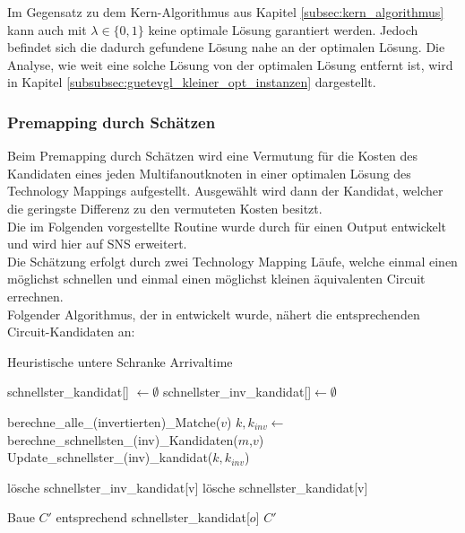 \documentclass[11pt, a4paper, german]{article}
\newcommand{\TM}{Technology  Mapping }
\begin{document}
Im Gegensatz zu dem Kern-Algorithmus aus Kapitel \ref{subsec:kern_algorithmus} kann auch mit $\lambda \in \{ 0 , 1\}$ keine optimale Lösung garantiert werden. Jedoch befindet sich die dadurch gefundene Lösung nahe an der optimalen Lösung. Die Analyse, wie weit eine solche Lösung von der optimalen Lösung entfernt ist, wird in Kapitel \ref{subsubsec:guetevgl_kleiner_opt_instanzen} dargestellt.
 
\subsubsection{Premapping durch Schätzen}
\label{subsec:premapping_duch_schaetzen}
Beim Premapping durch Schätzen wird eine Vermutung für die Kosten des Kandidaten eines jeden Multifanoutknoten in einer optimalen Lösung des Technology Mappings aufgestellt. Ausgewählt wird dann der Kandidat, welcher die geringste Differenz zu den vermuteten Kosten besitzt.\\
Die im Folgenden vorgestellte Routine wurde durch \cite{Elbert} für einen Output entwickelt und wird hier auf SNS erweitert.\\
Die Schätzung erfolgt durch zwei \TM Läufe, welche einmal einen möglichst schnellen und einmal einen möglichst kleinen äquivalenten Circuit errechnen.\\

Folgender Algorithmus, der in \cite{Elbert} entwickelt wurde, nähert die entsprechenden Circuit-Kandidaten an:\\

\begin{algorithm}[H]
 \LinesNumbered
 \DontPrintSemicolon
 \caption{Heuristische untere Schranke Arrivaltime}

 schnellster\_kandidat[] $\gets \emptyset$\;
 schnellster\_inv\_kandidat[]$ \gets \emptyset$\;
 {
   berechne\_alle\_(invertierten)\_Matche($v$)\;
   {
      $k,k_{inv} \gets $berechne\_schnellsten\_(inv)\_Kandidaten($m$,$v$)\;
      Update\_schnellster\_(inv)\_kandidat($k,k_{inv}$)\;
   }
   {
      
      {
	l\"osche schnellster\_inv\_kandidat[v]\;
      }
      \Else
      {
	l\"osche schnellster\_kandidat[v]\;
      }
   }
 }
 Baue $C'$ entsprechend schnellster\_kandidat[$o$]\;
 \Return $C'$\;
\end{algorithm}\ \\
\end{document}
